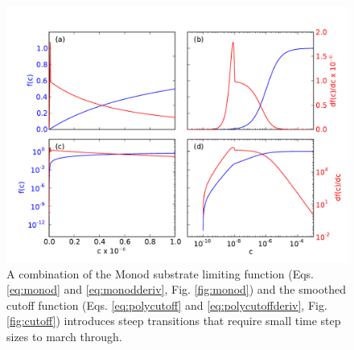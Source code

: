 \documentclass[gmd, manuscript]{copernicus}
\begin{document}
\begin{figure}[t]
\includegraphics[width=15cm]{../figs/fig04/fig04monodcutoff.pdf}
\caption{A combination of the Monod substrate limiting function (Eqs.
\ref{eq:monod} and \ref{eq:monodderiv}, Fig. \ref{fig:monod}) and the smoothed
cutoff function (Eqs. \ref{eq:polycutoff} and \ref{eq:polycutoffderiv}, Fig.
\ref{fig:cutoff}) introduces steep transitions that require small time step
sizes to march through.}
\label{fig:monodcutoff}
\end{figure}
\end{document}
